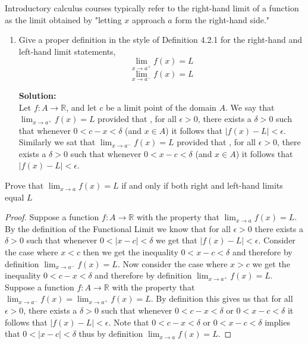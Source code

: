\documentclass[12pt]{article}
\makeatletter
\theoremstyle{homework}
\newenvironment{exercise}[1]
{\def\@currentlabel{#1}\exercisecore}
{\endexercisecore}
\newcommand{\localhead}[1]{\par\smallskip\noindent\textbf{#1}\nobreak\\}%
\newcommand\solution{\localhead{Solution:}}
\newcommand{\Reals}{\ensuremath{\mathbb R}}
\makeatother
\begin{document}
\begin{exercise}{Abbott 4.2.10} Introductory calculus courses typically refer to the right-hand limit of a function as the limit obtained by 
  "letting $x$ approach $a$ form the right-hand side."
  \begin{enumerate}
    \item Give a proper definition in the style of Definition 4.2.1 for the right-hand and left-hand limit statements,
    \begin{equation*}
      \lim_{x \to a^+} f(x) = L
    \end{equation*}
    \begin{equation*}
      \lim_{x \to a^-} f(x) = L
    \end{equation*}
    \solution Let $f: A \to \Reals$, and let $c$ be a limit point of the domain $A$. We say that $\lim_{x \to a^+} f(x) = L$ provided that , for all 
    $\epsilon >0$, there exists a $\delta > 0$ such that whenever $0 < c - x < \delta$ (and $x \in A$) it follows that $|f(x) - L| < \epsilon$. \\

    Similarly we sat that  $\lim_{x \to a^-} f(x) = L$ provided that , for all 
    $\epsilon >0$, there exists a $\delta > 0$ such that whenever $0 < x - c < \delta$ (and $x \in A$) it follows that $|f(x) - L| < \epsilon$. \\

   \end{enumerate}
   \vspace{.25in}


   \item Prove that $\lim_{x \to a} f(x) = L$ if and only if both right and left-hand limits equal $L$\\
   \begin{proof}
     Suppose a function  $f: A \to \Reals$ with the property that $\lim_{x \to a} f(x) = L$. By the definition of the Functional Limit we know that for all $\epsilon > 0$
     there exists a $\delta > 0$ such that whenever $0 <|x - c|<\delta$ we get that $|f(x) - L| < \epsilon$. Consider the case where $x < c$ then we get the inequality $0 < x - c < \delta$ and therefore by 
     definition  $\lim_{x \to a^-} f(x) = L$. Now consider the case where $x > c$ we get the inequality $0 < c - x < \delta$ and therefore by definition $\lim_{x \to a^+} f(x) = L$.\\


     Suppose a function  $f: A \to \Reals$ with the property that $ \lim_{x \to a^-} f(x) = \lim_{x \to a^+} f(x) = L$. By definition this gives us that for all 
     $\epsilon >0$, there exists a $\delta > 0$ such that whenever $0 < c - x < \delta$ or $0 < x - c < \delta$ it follows that $|f(x) - L| < \epsilon$. Note that $0 < c - x < \delta$ or $0 < x - c < \delta$ implies that $0 <|x - c|<\delta$
     thus by definition $\lim_{x \to a} f(x) = L$.
   \end{proof}



\end{exercise}
\end{document}
